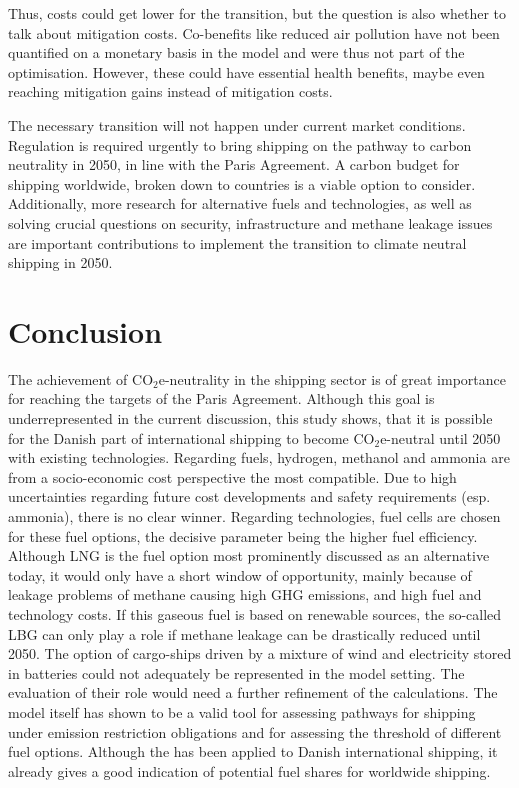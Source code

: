 \documentclass[article]{elsarticle}
\begin{document}
Thus, costs could get lower for the transition, but the question is also whether to talk about mitigation costs. Co-benefits like reduced air pollution have not been quantified on a monetary basis in the model and were thus not part of the optimisation. However, these could have essential health benefits, maybe even reaching mitigation gains instead of mitigation costs.

The necessary transition will not happen under current market conditions. Regulation is required urgently to bring shipping on the pathway to carbon neutrality in 2050, in line with the Paris Agreement. A carbon budget for shipping worldwide, broken down to countries is a viable option to consider. Additionally, more research for alternative fuels and technologies, as well as solving crucial questions on security, infrastructure and methane leakage issues are important contributions to implement the transition to climate neutral shipping in 2050. 


\section{Conclusion}
\label{sec:Conclusion}
The achievement of CO$_2$e-neutrality in the shipping sector is of great importance for reaching the targets of the Paris Agreement. Although this goal is underrepresented in the current discussion, this study shows, that it is possible for the Danish part of international shipping to become CO$_2$e-neutral until 2050 with existing technologies. Regarding fuels, hydrogen, methanol and ammonia are from a socio-economic cost perspective the most compatible. Due to high uncertainties regarding future cost developments and safety requirements (esp. ammonia), there is no clear winner. Regarding technologies, fuel cells are chosen for these fuel options, the decisive parameter being the higher fuel efficiency. Although LNG is the fuel option most prominently discussed as an alternative today, it would only have a short window of opportunity, mainly because of leakage problems of methane causing high GHG emissions, and high fuel and technology costs. If this gaseous fuel is based on renewable sources, the so-called LBG can only play a role if methane leakage can be drastically reduced until 2050. The option of cargo-ships driven by a mixture of wind and electricity stored in batteries could not adequately be represented in the model setting. The evaluation of their role would need a further refinement of the calculations. The model itself has shown to be a valid tool for assessing pathways for shipping under emission restriction obligations and for assessing the threshold of different fuel options. Although the has been applied to Danish international shipping, it already gives a good indication of potential fuel shares for worldwide shipping.
 
\end{document}
